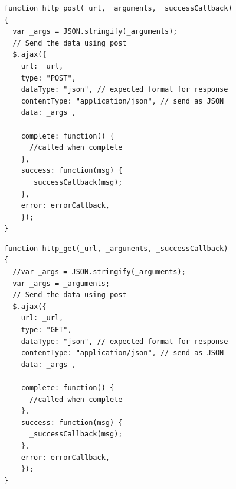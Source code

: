 \begin{lstlisting}[label=listing_http_api_post, caption=Fragment kodu pozwalający na użycie zapytań HTTP typu POST]
function http_post(_url, _arguments, _successCallback)
{
  var _args = JSON.stringify(_arguments);
  // Send the data using post
  $.ajax({
    url: _url,
    type: "POST",
    dataType: "json", // expected format for response
    contentType: "application/json", // send as JSON
    data: _args ,

    complete: function() {
      //called when complete
    },
    success: function(msg) {
      _successCallback(msg);
    },
    error: errorCallback,
    });
}
\end{lstlisting}


\begin{lstlisting}[label=listing_http_api_get, caption=Fragment kodu pozwalający na użycie zapytań HTTP typu GET]
function http_get(_url, _arguments, _successCallback)
{
  //var _args = JSON.stringify(_arguments);
  var _args = _arguments;
  // Send the data using post
  $.ajax({
    url: _url,
    type: "GET",
    dataType: "json", // expected format for response
    contentType: "application/json", // send as JSON
    data: _args ,

    complete: function() {
      //called when complete
    },
    success: function(msg) {
      _successCallback(msg);
    },
    error: errorCallback,
    });
}
\end{lstlisting}
